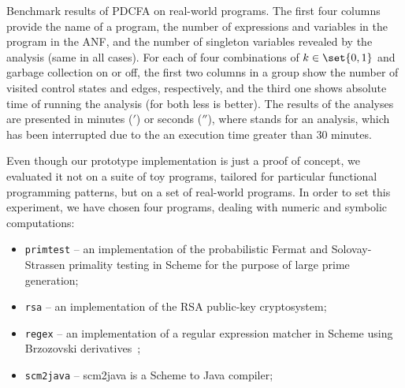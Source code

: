 \begin{table}
\caption{Benchmark results of PDCFA on real-world programs. The first four columns provide the name
  of a program, the number of expressions and variables in the
  program in the ANF, and the number of singleton variables revealed by the analysis (same in all cases). For each of four combinations of
  $k \in \set{0, 1}$ and garbage collection on or
  off, the first two columns in a group show the number of visited 
  control states and edges, respectively, and the third one shows absolute time of running the analysis (for both less is better). The results of the analyses are presented in minutes ($'$) or
  seconds ($''$), where {\linf} stands for an analysis, which has been interrupted due to the
  an execution time greater than 30 minutes.}
\label{fig:table-real}
\figrule
\end{table}
 
Even though our prototype implementation is just a proof of concept,
we evaluated it not on a suite of toy programs, tailored for
particular functional programming patterns, but on a set of real-world
programs. In order to set this experiment, we have chosen four
programs, dealing with numeric and symbolic computations:

\begin{itemize}

\item \texttt{primtest} -- an implementation of the
  probabilistic Fermat and Solovay-Strassen primality testing in
  Scheme for the purpose of large prime generation;

\item \texttt{rsa} -- an implementation of the RSA public-key
  cryptosystem;

\item \texttt{regex} -- an implementation of a regular expression
  matcher in Scheme using Brzozovski
  derivatives~\cite{Might-al:ICFP11,mattmight:Owens:2009:Derivative};

\item \texttt{scm2java} -- scm2java is a Scheme to Java compiler;

\end{itemize}

